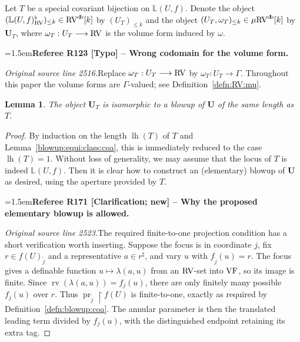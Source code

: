 \documentclass[12pt]{amsart}
\newcommand{\RefereeRemark}[4]{%
  \par\medskip\begingroup\normalfont\small\color{RefereePurple}%
  \emergencystretch=1.5em\noindent\textbf{Referee R#1 [#2] -- #3.}\par\nobreak\noindent #4\par
  \endgroup\medskip
}
\theoremstyle{plain}
\newtheorem{lem}[thm]{Lemma}
\theoremstyle{definition}
\theoremstyle{remark}
\numberwithin{equation}{section}
\theoremstyle{plain}
\newcommand{\VF}{\textup{VF}}
\newcommand{\RV}{\textup{RV}}
\DeclareMathOperator{\lh}{lh}
\DeclareMathOperator{\pr}{pr}
\newcommand{\0}{\emptyset}
\newcommand{\bb}[1]{\mathbb{#1}}
\newcommand{\rest}{\upharpoonright}
\newcommand{\fun}{\longrightarrow}
\newcommand{\mRV}{{\mu}{\RV}}
\DeclareMathOperator{\rv}{rv}
\DeclareMathOperator{\db}{d \! b}
\begin{document}
Let  $T$ be a special covariant bijection on $\bb L (U,f)$. Denote the object $(\mathbb{L} (U,f)^\flat_{\RV})_{\leq k} \in \RV^{\db}[k]$ by $(U_{T})_{\leq k}$ and  the object $(U_{T}, \omega_T)_{\leq k} \in \mRV^{\db}[k]$ by $\bm U_{T}$, where $\omega_T : U_{T} \fun \RV$ is the volume form induced by $\omega$.

\RefereeRemark{123}{Typo}{Wrong codomain for the volume form}{%
\textit{Original source line 2516.}\quad Replace $\omega_T:U_T\longrightarrow\RV$ by $\omega_T:U_T\longrightarrow\Gamma$. Throughout this paper the volume forms are $\Gamma$-valued; see Definition~\ref{defn:RV:mu}.
}


\begin{lem}\label{special:to:blowup:coa}
The object $\bm U_T$ is isomorphic to a blowup of $\bm U$ of the same length as $T$.
\end{lem}
\begin{proof}
By induction on the length $\lh (T)$ of $T$ and Lemma~\ref{blowup:equi:class:coa}, this is immediately reduced to the case $\lh (T) = 1$. Without loss of generality, we may assume that the locus of $T$ is indeed $\mathbb{L} (U,f)$. Then it is clear how to construct an (elementary) blowup of $\bm U$ as desired, using the aperture provided by $T$.

\RefereeRemark{171}{Clarification; new}{Why the proposed elementary blowup is allowed}{%
\textit{Original source line 2523.}\quad The required finite-to-one projection condition has a short verification worth inserting. Suppose the focus is in coordinate $j$, fix $r\in f(U)_{\tilde j}$ and a representative $a\in r^\sharp$, and vary $u$ with $f_{\tilde j}(u)=r$. The focus gives a definable function $u\mapsto\lambda(a,u)$ from an $\RV$-set into $\VF$, so its image is finite. Since $\rv(\lambda(a,u))=f_j(u)$, there are only finitely many possible $f_j(u)$ over $r$. Thus $\pr_{\tilde j}\rest f(U)$ is finite-to-one, exactly as required by Definition~\ref{defn:blowup:coa}. The annular parameter is then the translated leading term divided by $f_j(u)$, with the distinguished endpoint retaining its extra tag.
}
\end{proof}
\end{document}
